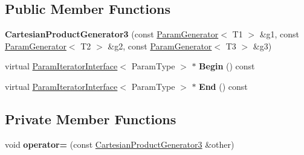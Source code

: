 \subsection*{Public Member Functions}
\begin{DoxyCompactItemize}
\item 
\mbox{\label{classtesting_1_1internal_1_1_cartesian_product_generator3_afdca1e94b01f654564b9cbe66fb5ca94}} 
{\bfseries Cartesian\+Product\+Generator3} (const \mbox{\hyperlink{classtesting_1_1internal_1_1_param_generator}{Param\+Generator}}$<$ T1 $>$ \&g1, const \mbox{\hyperlink{classtesting_1_1internal_1_1_param_generator}{Param\+Generator}}$<$ T2 $>$ \&g2, const \mbox{\hyperlink{classtesting_1_1internal_1_1_param_generator}{Param\+Generator}}$<$ T3 $>$ \&g3)
\item 
\mbox{\label{classtesting_1_1internal_1_1_cartesian_product_generator3_ac06420eea4a669c4a93503e0d1eccdc8}} 
virtual \mbox{\hyperlink{classtesting_1_1internal_1_1_param_iterator_interface}{Param\+Iterator\+Interface}}$<$ Param\+Type $>$ $\ast$ {\bfseries Begin} () const
\item 
\mbox{\label{classtesting_1_1internal_1_1_cartesian_product_generator3_a892abda9027eca8daf3d141dde4903cc}} 
virtual \mbox{\hyperlink{classtesting_1_1internal_1_1_param_iterator_interface}{Param\+Iterator\+Interface}}$<$ Param\+Type $>$ $\ast$ {\bfseries End} () const
\end{DoxyCompactItemize}
\subsection*{Private Member Functions}
\begin{DoxyCompactItemize}
\item 
\mbox{\label{classtesting_1_1internal_1_1_cartesian_product_generator3_a5f556e753dcc2289ff1ab78a27e327e5}} 
void {\bfseries operator=} (const \mbox{\hyperlink{classtesting_1_1internal_1_1_cartesian_product_generator3}{Cartesian\+Product\+Generator3}} \&other)
\end{DoxyCompactItemize}
